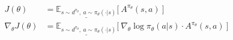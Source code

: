 \begin{align*}
J(\theta) &= \underline{\mathbb{E}_{s \sim d^{\pi_\theta},\ a \sim \pi_\theta(\cdot|s)}} \Big\lbrack\ A^{\pi_\theta}(s, a) \ \Big\rbrack \\
\nabla_\theta J(\theta) &= \underline{\mathbb{E}_{s \sim d^{\pi_\theta},\ a \sim \pi_\theta(\cdot|s)}} \Big\lbrack\ \nabla_\theta\log \pi_\theta(a|s)\cdot A^{\pi_\theta}(s, a) \ \Big\rbrack
\end{align*}